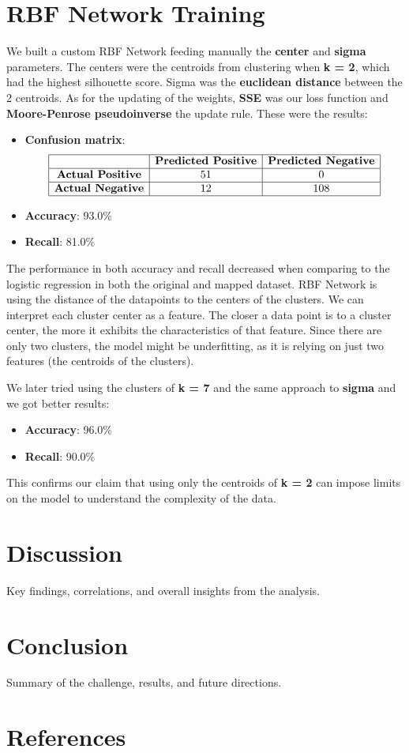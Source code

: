 \documentclass[a4paper,12pt]{article}
\begin{document}
\section{RBF Network Training}
\label{sec:rbf-network}
We built a custom RBF Network feeding manually the \textbf{center} and \textbf{sigma} parameters. The centers were the centroids from clustering when \textbf{k = 2}, which had the highest silhouette score. Sigma was the \textbf{euclidean distance} between the 2 centroids. As for the updating of the weights, \textbf{SSE} was our loss function and \textbf{Moore-Penrose pseudoinverse} the update rule. These were the results:
\begin{itemize}
    \item \textbf{Confusion matrix}: 
    \[
    \begin{array}{|c|c|c|}
    \hline
    & \textbf{Predicted Positive} & \textbf{Predicted Negative} \\
    \hline
    \textbf{Actual Positive} & 51 & 0 \\
    \hline
    \textbf{Actual Negative} & 12 & 108 \\
    \hline
    \end{array}
    \]
    \item \textbf{Accuracy}: 93.0\%
    \item \textbf{Recall}: 81.0\%
\end{itemize}
The performance in both accuracy and recall decreased when comparing to the logistic regression in both the original and mapped dataset.  RBF Network is using the distance of the datapoints to the centers of the clusters. We can interpret each cluster center as a feature. The closer a data point is to a cluster center, the more it exhibits the characteristics of that feature. Since there are only two clusters, the model might be underfitting, as it is relying on just two features (the centroids of the clusters).

We later tried using the clusters of \textbf{k = 7} and the same approach to \textbf{sigma} and we got better results:
\begin{itemize}
    \item \textbf{Accuracy}: 96.0\%
    \item \textbf{Recall}: 90.0\%
\end{itemize}
This confirms our claim that using only the centroids of \textbf{k = 2} can impose limits on the model to understand the complexity of the data.
\section{Discussion}
\label{sec:discussion}
Key findings, correlations, and overall insights from the analysis.

\section{Conclusion}
\label{sec:conclusion}
Summary of the challenge, results, and future directions.

\section*{References}
\label{sec:references}
\end{document}
